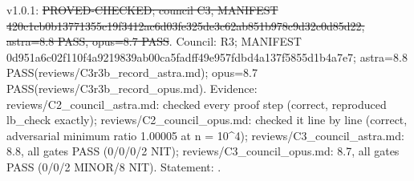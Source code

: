 \begin{proposition}\label{reg:W3-POST_Prop-LB}
\end{proposition}
\begin{statusbox}
 v1.0.1: \st{PROVED-CHECKED; council C3, MANIFEST 420c1cb0b13771355c19f3412ac6d03fe325de3c62ab851b978c9d32c0d85d22, astra=8.8 PASS, opus=8.7 PASS}. Council: R3; MANIFEST 0d951a6c02f110f4a9219839ab00ca5fadff49e957fdbd4a137f5855d1b4a7e7; astra=8.8 PASS(reviews/C3r3b\_record\_astra.md); opus=8.7 PASS(reviews/C3r3b\_record\_opus.md). Evidence: reviews/C2\_council\_astra.md: checked every proof step (correct, reproduced lb\_check exactly); reviews/C2\_council\_opus.md: checked it line by line (correct, adversarial minimum ratio 1.00005 at n = 10\^{}4); reviews/C3\_council\_astra.md: 8.8, all gates PASS (0/0/0/2 NIT); reviews/C3\_council\_opus.md: 8.7, all gates PASS (0/0/2 MINOR/8 NIT). Statement: .
\end{statusbox}
